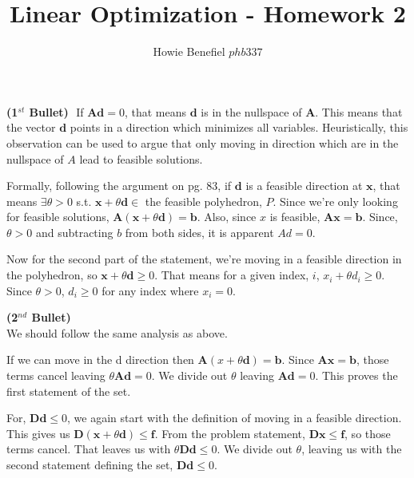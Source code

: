 \documentclass[12pt]{article}
\newcommand{\matr}[1]{\mathbf{#1}}
\newenvironment{problem}[2][Problem]{\begin{trivlist}
\item[\hskip \labelsep {\bfseries #1}\hskip \labelsep {\bfseries #2.}]}{\end{trivlist}}
\newenvironment{subproblem}[1]{\textbf{(#1)}}{}
\theoremstyle{definition}
\begin{document}

\title{Linear Optimization - Homework 2}
\author{Howie Benefiel \(phb337\)}
\maketitle

\begin{problem}{1}
\begin{subproblem}{1$^{st}$ Bullet}
$ $ \newline
If $\matr{A}\matr{d}=0$, that means $\matr{d}$ is in the nullspace of $\matr{A}$.
This means that the vector $\matr{d}$ points in a direction which minimizes all variables.
Heuristically, this observation can be used to argue that only moving in direction which are in the nullspace of $A$ lead to feasible solutions.

Formally, following the argument on pg. 83,
if $\matr{d}$ is a feasible direction at $\matr{x}$, that means $\exists  \theta > 0$ s.t. $\matr{x} + \theta \matr{d} \in$ the feasible polyhedron, $P$.
Since we're only looking for feasible solutions, $\matr{A}(\matr{x} + \theta \matr{d})=\matr{b}$.
Also, since $x$ is feasible, $\matr{A}\matr{x} = \matr{b}$.
Since, $\theta > 0$ and subtracting $b$ from both sides, it is apparent $Ad=0$.

Now for the second part of the statement, we're moving in a feasible direction in the polyhedron,
so $\matr{x}+\theta \matr{d} \geq 0$.
That means for a given index, $i$, $x_i+\theta d_i \geq 0$.
Since $\theta > 0$, $d_i \geq 0$ for any index where $x_i=0$. \\
\end{subproblem}

\begin{subproblem}{2$^{nd}$ Bullet}
$ $ \\
We should follow the same analysis as above.

If we can move in the d direction then $\matr{A}(x + \theta \matr{d}) = \matr{b}$.
Since $\matr{A}\matr{x}=\matr{b}$, those terms cancel leaving $\theta \matr{A} \matr{d} = 0$.
We divide out $\theta$ leaving $\matr{A}\matr{d}=0$.
This proves the first statement of the set.

For, $\matr{D}\matr{d} \leq 0$, we again start with the definition of moving in a feasible direction.
This gives us $\matr{D}(\matr{x}+\theta\matr{d}) \leq \matr{f}$.
From the problem statement, $\matr{D}\matr{x} \leq \matr{f}$, so those terms cancel.
That leaves us with $\theta\matr{D}\matr{d} \leq 0$.
We divide out $\theta$, leaving us with the second statement defining the set, $\matr{D}\matr{d} \leq 0$.
\end{subproblem}

\end{problem}
\end{document}
